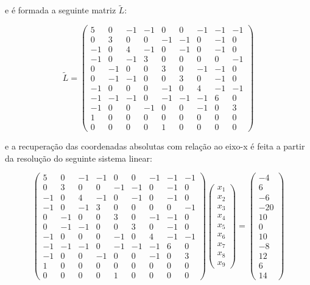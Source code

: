 \noindent e é formada a seguinte matriz $\tilde{L}$:

$$\tilde{L} = \begin{pmatrix}
5 & 0 & -1 & -1 & 0 & 0 & -1 & -1 & -1\\
0 & 3 & 0 & 0 & -1 & -1 & 0 & -1 & 0\\
-1 & 0 & 4 & -1 & 0 & -1 & 0 & -1 & 0\\
-1 & 0 & -1 & 3 & 0 & 0 & 0 & 0 & -1\\
0 & -1 & 0 & 0 & 3 & 0 & -1 & -1 & 0\\
0 & -1 & -1 & 0 & 0 & 3 & 0 & -1 & 0\\
-1 & 0 & 0 & 0 & -1 & 0 & 4 & -1 & -1\\
-1 & -1 & -1 & 0 & -1 & -1 & -1 & 6 & 0\\
-1 & 0 & 0 & -1 & 0 & 0 & -1 & 0 & 3\\
1 & 0 & 0 & 0 & 0 & 0 & 0 & 0 & 0\\
0 & 0 & 0 & 0 & 1 & 0 & 0 & 0 & 0
\end{pmatrix}$$

\noindent e a recuperação das coordenadas absolutas com relação ao eixo-x é feita a partir da resolução do seguinte sistema linear:

$$\begin{pmatrix}
5 & 0 & -1 & -1 & 0 & 0 & -1 & -1 & -1\\
0 & 3 & 0 & 0 & -1 & -1 & 0 & -1 & 0\\
-1 & 0 & 4 & -1 & 0 & -1 & 0 & -1 & 0\\
-1 & 0 & -1 & 3 & 0 & 0 & 0 & 0 & -1\\
0 & -1 & 0 & 0 & 3 & 0 & -1 & -1 & 0\\
0 & -1 & -1 & 0 & 0 & 3 & 0 & -1 & 0\\
-1 & 0 & 0 & 0 & -1 & 0 & 4 & -1 & -1\\
-1 & -1 & -1 & 0 & -1 & -1 & -1 & 6 & 0\\
-1 & 0 & 0 & -1 & 0 & 0 & -1 & 0 & 3\\
1 & 0 & 0 & 0 & 0 & 0 & 0 & 0 & 0\\
0 & 0 & 0 & 0 & 1 & 0 & 0 & 0 & 0
\end{pmatrix} \begin{pmatrix} x_1\\x_2\\x_3\\x_4\\x_5\\x_6\\x_7\\x_8\\x_9\end{pmatrix} = \begin{pmatrix}
-4\\
6\\
-6\\
-20\\
10\\
0\\
10\\
-8\\
12\\
6\\
14
\end{pmatrix}$$

